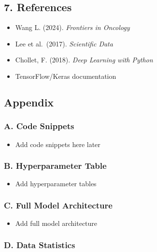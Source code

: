 \documentclass[
  12pt,
  letterpaper,
  DIV=11,
  numbers=noendperiod]{scrartcl}
\providecommand{\tightlist}{%
  \setlength{\itemsep}{0pt}\setlength{\parskip}{0pt}}
\begin{document}
\subsection{7. References}\label{references}

\begin{itemize}
\tightlist
\item
  Wang L. (2024). \emph{Frontiers in Oncology}
\item
  Lee et al.~(2017). \emph{Scientific Data}
\item
  Chollet, F. (2018). \emph{Deep Learning with Python}
\item
  TensorFlow/Keras documentation
\end{itemize}

\subsection{Appendix}\label{appendix}

\subsubsection{A. Code Snippets}\label{a.-code-snippets}

\begin{itemize}
\tightlist
\item
  Add code snippets here later
\end{itemize}

\subsubsection{B. Hyperparameter Table}\label{b.-hyperparameter-table}

\begin{itemize}
\tightlist
\item
  Add hyperparameter tables
\end{itemize}

\subsubsection{C. Full Model
Architecture}\label{c.-full-model-architecture}

\begin{itemize}
\tightlist
\item
  Add full model architecture
\end{itemize}

\subsubsection{D. Data Statistics}\label{d.-data-statistics}
\end{document}
